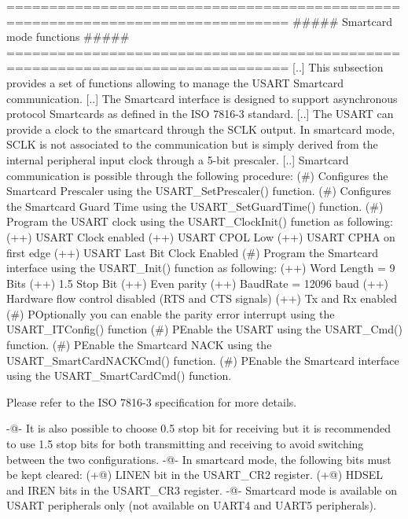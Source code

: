 \begin{DoxyVerb} ===============================================================================
                              ##### Smartcard mode functions #####
 ===============================================================================  
    [..]
    This subsection provides a set of functions allowing to manage the USART 
    Smartcard communication.
    [..]
    The Smartcard interface is designed to support asynchronous protocol Smartcards as
    defined in the ISO 7816-3 standard.
    [..]
    The USART can provide a clock to the smartcard through the SCLK output.
    In smartcard mode, SCLK is not associated to the communication but is simply derived 
    from the internal peripheral input clock through a 5-bit prescaler.
    [..]
    Smartcard communication is possible through the following procedure:
      (#) Configures the Smartcard Prescaler using the USART_SetPrescaler() function.
      (#) Configures the Smartcard Guard Time using the USART_SetGuardTime() function.
      (#) Program the USART clock using the USART_ClockInit() function as following:
        (++) USART Clock enabled
        (++) USART CPOL Low
        (++) USART CPHA on first edge
        (++) USART Last Bit Clock Enabled
      (#) Program the Smartcard interface using the USART_Init() function as following:
        (++) Word Length = 9 Bits
        (++) 1.5 Stop Bit
        (++) Even parity
        (++) BaudRate = 12096 baud
        (++) Hardware flow control disabled (RTS and CTS signals)
        (++) Tx and Rx enabled
      (#) POptionally you can enable the parity error interrupt using the USART_ITConfig()
          function
      (#) PEnable the USART using the USART_Cmd() function.
      (#) PEnable the Smartcard NACK using the USART_SmartCardNACKCmd() function.
      (#) PEnable the Smartcard interface using the USART_SmartCardCmd() function.

    Please refer to the ISO 7816-3 specification for more details.

      -@- It is also possible to choose 0.5 stop bit for receiving but it is recommended 
          to use 1.5 stop bits for both transmitting and receiving to avoid switching 
          between the two configurations.
      -@- In smartcard mode, the following bits must be kept cleared:
        (+@) LINEN bit in the USART_CR2 register.
        (+@) HDSEL and IREN bits in the USART_CR3 register.
      -@- Smartcard mode is available on USART peripherals only (not available on UART4 
          and UART5 peripherals).\end{DoxyVerb}
 

